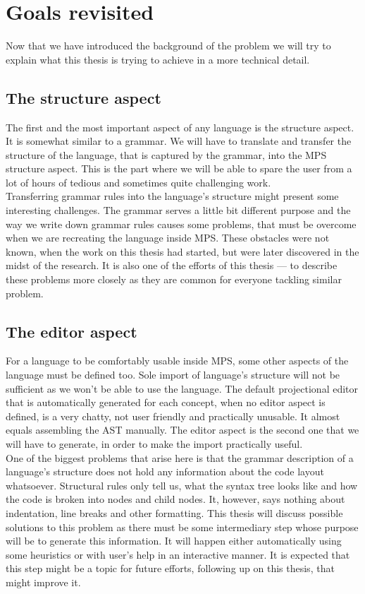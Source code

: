 \chapter{Goals revisited}

Now that we have introduced the background of the problem we will try to explain what this thesis is trying to achieve in a more technical detail.

\section{The structure aspect}
The first and the most important aspect of any language is the structure aspect.
It is somewhat similar to a grammar.
We will have to translate and transfer the structure of the language, that is captured by the grammar, into the MPS structure aspect.
This is the part where we will be able to spare the user from a lot of hours of tedious and sometimes quite challenging work.
\\

Transferring grammar rules into the language's structure might present some interesting challenges.
The grammar serves a little bit different purpose and the way we write down grammar rules causes some problems, that must be overcome when we are recreating the language inside MPS.
These obstacles were not known, when the work on this thesis had started, but were later discovered in the midst of the research.
It is also one of the efforts of this thesis --- to describe these problems more closely as they are common for everyone tackling similar problem.

\section{The editor aspect}
For a language to be comfortably usable inside MPS, some other aspects of the language must be defined too.
Sole import of language's structure will not be sufficient as we won't be able to use the language.
The default projectional editor that is automatically generated for each concept, when no editor aspect is defined, is a very chatty, not user friendly and practically unusable.
It almost equals assembling the AST manually.
The editor aspect is the second one that we will have to generate, in order to make the import practically useful.
\\

One of the biggest problems that arise here is that the grammar description of a language's structure does not hold any information about the code layout whatsoever.
Structural rules only tell us, what the syntax tree looks like and how the code is broken into nodes and child nodes.
It, however, says nothing about indentation, line breaks and other formatting.
This thesis will discuss possible solutions to this problem as there must be some intermediary step whose purpose will be to generate this information.
It will happen either automatically using some heuristics or with user's help in an interactive manner.
It is expected that this step might be a topic for future efforts, following up on this thesis, that might improve it.

